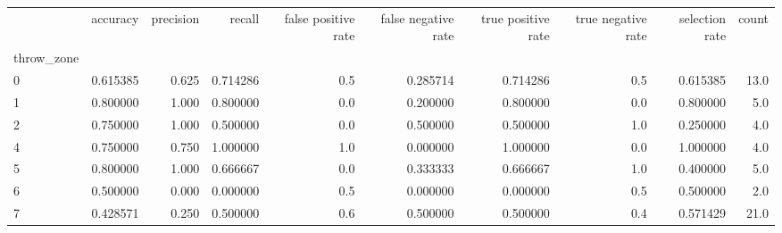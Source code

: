 \begin{tabular}{lrrrrrrrrr}
\toprule
{} &  accuracy &  precision &    recall &  false positive rate &  false negative rate &  true positive rate &  true negative rate &  selection rate &  count \\
throw\_zone &           &            &           &                      &                      &                     &                     &                 &        \\
\midrule
0          &  0.615385 &      0.625 &  0.714286 &                  0.5 &             0.285714 &            0.714286 &                 0.5 &        0.615385 &   13.0 \\
1          &  0.800000 &      1.000 &  0.800000 &                  0.0 &             0.200000 &            0.800000 &                 0.0 &        0.800000 &    5.0 \\
2          &  0.750000 &      1.000 &  0.500000 &                  0.0 &             0.500000 &            0.500000 &                 1.0 &        0.250000 &    4.0 \\
4          &  0.750000 &      0.750 &  1.000000 &                  1.0 &             0.000000 &            1.000000 &                 0.0 &        1.000000 &    4.0 \\
5          &  0.800000 &      1.000 &  0.666667 &                  0.0 &             0.333333 &            0.666667 &                 1.0 &        0.400000 &    5.0 \\
6          &  0.500000 &      0.000 &  0.000000 &                  0.5 &             0.000000 &            0.000000 &                 0.5 &        0.500000 &    2.0 \\
7          &  0.428571 &      0.250 &  0.500000 &                  0.6 &             0.500000 &            0.500000 &                 0.4 &        0.571429 &   21.0 \\
\bottomrule
\end{tabular}
